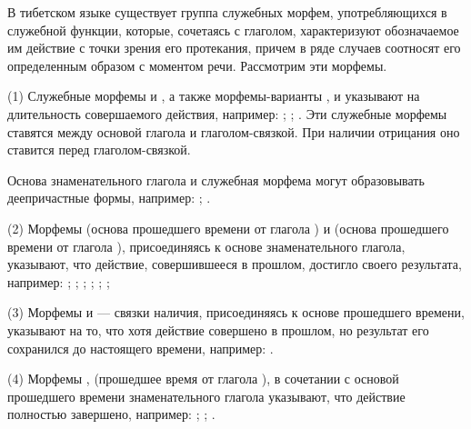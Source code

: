 В тибетском языке существует группа служебных морфем, употребляющихся в служебной функции, которые, сочетаясь с глаголом, характеризуют обозначаемое им действие с точки зрения его протекания, причем в ряде случаев соотносят его определенным образом с моментом речи. Рассмотрим эти морфемы.

(1)	Служебные морфемы  и , а также морфемы-варианты ,  и  указывают на длительность совершаемого действия, например:
;
;
.
Эти служебные морфемы ставятся между основой глагола и глаголом-связкой. При наличии отрицания оно ставится перед глаголом-связкой.

Основа знаменательного глагола и служебная морфема  могут образовывать деепричастные формы, например:
;
.

(2)	Морфемы  (основа прошедшего времени от глагола ) и  (основа прошедшего времени от глагола ), присоединяясь к основе знаменательного глагола, указывают, что действие, совершившееся в прошлом, достигло своего результата, например:
;
;
;
;
;
;

(3)	Морфемы	 и	 --- связки наличия, присоединяясь к основе прошедшего времени, указывают на то, что хотя действие совершено в прошлом, но результат его сохранился до настоящего времени, например:
.

(4)	Морфемы ,  (прошедшее время от глагола ),  в сочетании с основой прошедшего времени знаменательного глагола указывают, что действие полностью завершено, например:
;
;
.

